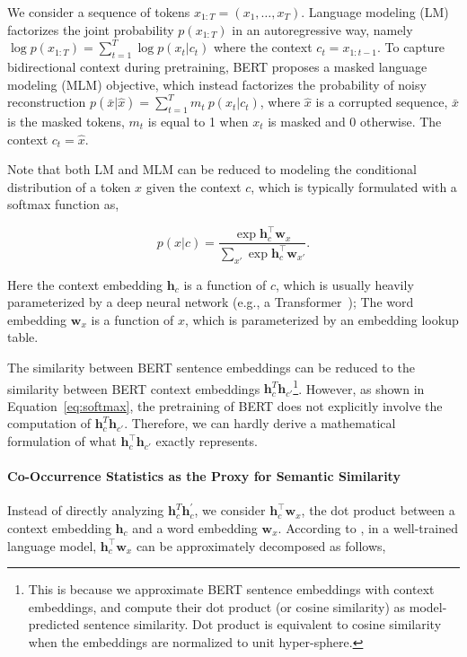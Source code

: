 \documentclass[11pt,a4paper]{article}
\def\rvh{{\mathbf{h}}}
\def\rvw{{\mathbf{w}}}
\begin{document}
We consider a sequence of tokens $x_{1:T} = (x_1, \ldots , x_T )$. Language modeling (LM) factorizes the joint probability $p(x_{1:T})$ in an autoregressive way, namely $\log p(x_{1:T}) = \sum_{t=1}^T \log p(x_t | c_t)$ where the context $c_t = x_{1:t-1}$. To capture bidirectional context during pretraining, BERT proposes a masked language modeling (MLM) objective, which instead factorizes the probability of noisy reconstruction $p(\bar{x} | \hat{x}) = \sum_{t=1}^T {m_t}~ p(x_t | c_t)$, where $\hat{x}$ is a corrupted sequence, $\bar{x}$ is the masked tokens, $m_t$ is equal to 1 when $x_t$ is masked and 0 otherwise. The context $c_t = \hat{x}$.

Note that both LM and MLM can be reduced to modeling the conditional distribution of a token $x$ given the context $c$, which is typically formulated with a softmax function as,

\begin{equation}
    \label{eq:softmax}
    p(x | c) = \frac{\exp \rvh_c^\top \rvw_x}{\sum_{x'} \exp \rvh_c^\top \rvw_{x'}} .
\end{equation}

Here the context embedding $\rvh_c$ is a function of $c$, which is usually heavily parameterized by a deep neural network (e.g., a Transformer~\citep{vaswani2017attention}); The word embedding $\rvw_x$ is a function of $x$, which is parameterized by an embedding lookup table. 

The similarity between BERT sentence embeddings can be reduced to the similarity between BERT context embeddings $\rvh_c^T \rvh_{c'}$\footnote{This is because we approximate BERT sentence embeddings with context embeddings, and compute their dot product (or cosine similarity) as model-predicted sentence similarity. Dot product is equivalent to cosine similarity when the embeddings are normalized to unit hyper-sphere.}.
However, as shown in Equation~\ref{eq:softmax}, the pretraining of BERT does not explicitly involve the computation of $\rvh_c^T \rvh_{c'}$. Therefore, we can hardly derive a mathematical formulation of what $\rvh_c^\top \rvh_{c'}$ exactly represents. 


\paragraph{Co-Occurrence Statistics as the Proxy for Semantic Similarity} 
Instead of directly analyzing $\rvh_c^T \rvh_c^{\prime}$, we consider $\rvh_c^\top \rvw_x$, the dot product between a context embedding $\rvh_c$ and a word embedding $\rvw_x$. According to \citet{yang2017breaking}, in a well-trained language model, $\rvh_c^\top \rvw_x$ can be approximately decomposed as follows,
\end{document}
